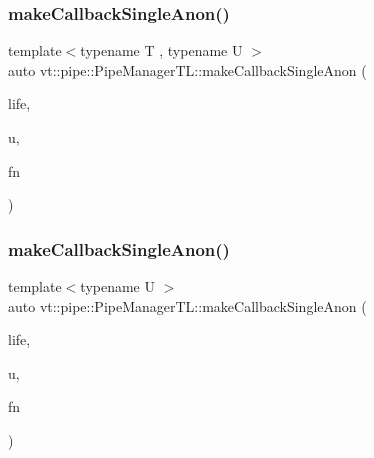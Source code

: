 \mbox{\label{structvt_1_1pipe_1_1_pipe_manager_t_l_a99c60d656fee4e528ff61cacc2f89392}} 
\subsubsection{\texorpdfstring{make\+Callback\+Single\+Anon()}{makeCallbackSingleAnon()}\hspace{0.1cm}{\footnotesize\ttfamily [2/6]}}
{\footnotesize\ttfamily template$<$typename T , typename U $>$ \\
auto vt\+::pipe\+::\+Pipe\+Manager\+T\+L\+::make\+Callback\+Single\+Anon (\begin{DoxyParamCaption}\item[{\hyperlink{namespacevt_1_1pipe_acb42b284378c0fdac1d7c6335dc26f58}{Lifetime\+Enum}}]{life,  }\item[{U $\ast$}]{u,  }\item[{\hyperlink{structvt_1_1pipe_1_1_pipe_manager_base_a73fdf82ece0411b3dc644c99b763f7a9}{Func\+Msg\+Ctx\+Type}$<$ T, U $>$}]{fn }\end{DoxyParamCaption})}

\mbox{\label{structvt_1_1pipe_1_1_pipe_manager_t_l_a07b4b67231348cb486b6c796152c27f2}} 
\subsubsection{\texorpdfstring{make\+Callback\+Single\+Anon()}{makeCallbackSingleAnon()}\hspace{0.1cm}{\footnotesize\ttfamily [3/6]}}
{\footnotesize\ttfamily template$<$typename U $>$ \\
auto vt\+::pipe\+::\+Pipe\+Manager\+T\+L\+::make\+Callback\+Single\+Anon (\begin{DoxyParamCaption}\item[{\hyperlink{namespacevt_1_1pipe_acb42b284378c0fdac1d7c6335dc26f58}{Lifetime\+Enum}}]{life,  }\item[{U $\ast$}]{u,  }\item[{\hyperlink{structvt_1_1pipe_1_1_pipe_manager_base_ad8463823b6b4cfdb67c119d6d22e3bac}{Func\+Ctx\+Type}$<$ U $>$}]{fn }\end{DoxyParamCaption})}

